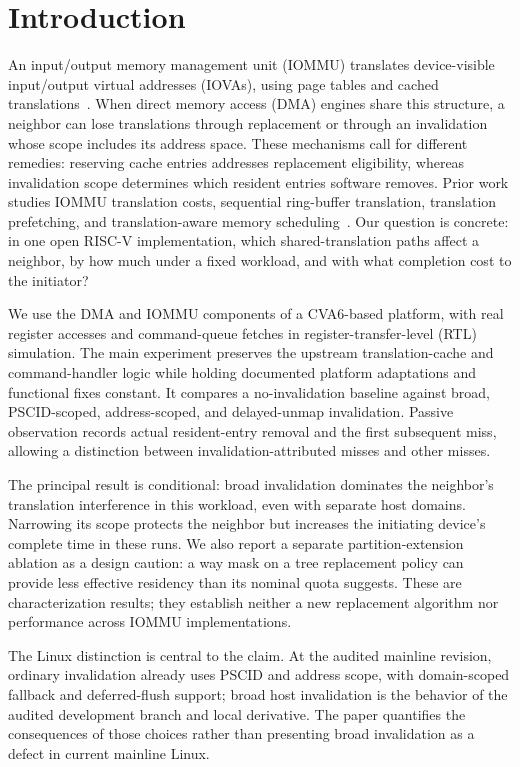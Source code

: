 \documentclass[sigconf,nonacm]{acmart}
\newcommand{\claim}[1]{} %
\begin{document}
\section{Introduction}
An input/output memory management unit (IOMMU) translates device-visible input/output virtual addresses (IOVAs), using page tables and cached translations~\cite{riscv_iommu_spec2026}.\claim{C010}
When direct memory access (DMA) engines share this structure, a neighbor can lose translations through replacement or through an invalidation whose scope includes its address space.\claim{C011}
These mechanisms call for different remedies: reserving cache entries addresses replacement eligibility, whereas invalidation scope determines which resident entries software removes.\claim{C012}
Prior work studies IOMMU translation costs, sequential ring-buffer translation, translation prefetching, and translation-aware memory scheduling~\cite{iotlb_bottleneck2010,riommu2015,socdma2018,mask2018}.\claim{C013}
Our question is concrete: in one open RISC-V implementation, which shared-translation paths affect a neighbor, by how much under a fixed workload, and with what completion cost to the initiator?

We use the DMA and IOMMU components of a CVA6-based platform, with real register accesses and command-queue fetches in register-transfer-level (RTL) simulation.\claim{C014}
The main experiment preserves the upstream translation-cache and command-handler logic while holding documented platform adaptations and functional fixes constant.\claim{C015}
It compares a no-invalidation baseline against broad, PSCID-scoped, address-scoped, and delayed-unmap invalidation.\claim{C016}
Passive observation records actual resident-entry removal and the first subsequent miss, allowing a distinction between invalidation-attributed misses and other misses.\claim{C017}

The principal result is conditional: broad invalidation dominates the neighbor's translation interference in this workload, even with separate host domains.\claim{C018}
Narrowing its scope protects the neighbor but increases the initiating device's complete time in these runs.\claim{C019}
We also report a separate partition-extension ablation as a design caution: a way mask on a tree replacement policy can provide less effective residency than its nominal quota suggests.\claim{C020}
These are characterization results; they establish neither a new replacement algorithm nor performance across IOMMU implementations.

The Linux distinction is central to the claim. At the audited mainline revision, ordinary invalidation already uses PSCID and address scope, with domain-scoped fallback and deferred-flush support; broad host invalidation is the behavior of the audited development branch and local derivative.\claim{C021}
The paper quantifies the consequences of those choices rather than presenting broad invalidation as a defect in current mainline Linux.
\end{document}

